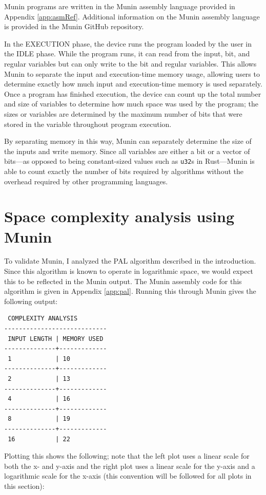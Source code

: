 \documentclass[11pt, a4paper]{article}
\begin{document}
Munin programs are written in the Munin assembly language provided in Appendix \ref{app:asmRef}.
Additional information on the Munin assembly language is provided in the Munin GitHub repository.

In the EXECUTION phase, the device runs the program loaded by the user in the IDLE phase.
While the program runs, it can read from the input, bit, and regular variables but can only write to the bit and regular variables.
This allows Munin to separate the input and execution-time memory usage, allowing users to determine exactly how much input and execution-time memory is used separately.
Once a program has finished execution, the device can count up the total number and size of variables to determine how much space was used by the program; the sizes or variables are determined by the maximum number of bits that were stored in the variable throughout program execution.

By separating memory in this way, Munin can separately determine the size of the inputs and write memory.
Since all variables are either a bit or a vector of bits—as opposed to being constant-sized values such as \lstinline|u32|s in Rust—Munin is able to count exactly the number of bits required by algorithms without the overhead required by other programming languages.

\section{Space complexity analysis using Munin}

To validate Munin, I analyzed the PAL algorithm described in the introduction.
Since this algorithm is known to operate in logarithmic space, we would expect this to be reflected in the Munin output.
The Munin assembly code for this algorithm is given in Appendix \ref{app:pal}.
Running this through Munin gives the following output:

\begin{lstlisting}
 COMPLEXITY ANALYSIS
----------------------------
 INPUT LENGTH | MEMORY USED 
--------------+-------------
 1            | 10      
--------------+-------------
 2            | 13      
--------------+-------------
 4            | 16      
--------------+-------------
 8            | 19      
--------------+-------------
 16           | 22      
\end{lstlisting}

Plotting this shows the following; note that the left plot uses a linear scale for both the x- and y-axis and the right plot uses a linear scale for the y-axis and a logarithmic scale for the x-axis (this convention will be followed for all plots in this section):
\end{document}
